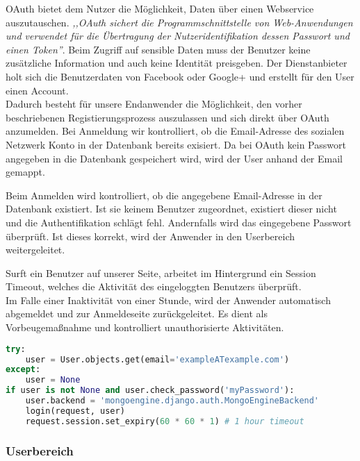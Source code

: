 OAuth bietet dem Nutzer die Möglichkeit, Daten über einen Webservice auszutauschen. \textit{,,OAuth sichert die Programmschnittstelle von Web-Anwendungen und verwendet für die Übertragung der Nutzeridentifikation dessen Passwort und einen Token''}\cite{OAUTH}. Beim Zugriff auf sensible Daten muss der Benutzer keine zusätzliche Information und auch keine Identität preisgeben. Der Dienstanbieter holt sich die Benutzerdaten von Facebook oder Google+ und erstellt für den User einen Account.\\
Dadurch besteht für unsere Endanwender die Möglichkeit, den vorher beschriebenen Registierungsprozess auszulassen und sich direkt über OAuth anzumelden. Bei Anmeldung wir kontrolliert, ob die Email-Adresse des sozialen Netzwerk Konto in der Datenbank bereits exisiert. Da bei OAuth kein Passwort angegeben in die Datenbank gespeichert wird, wird der User anhand der Email gemappt.





Beim Anmelden wird kontrolliert, ob die angegebene Email-Adresse in der Datenbank existiert. Ist sie keinem Benutzer zugeordnet, existiert dieser nicht und die Authentifikation schlägt fehl. Andernfalls wird das eingegebene Passwort überprüft. Ist dieses korrekt, wird der Anwender in den Userbereich weitergeleitet.

Surft ein Benutzer auf unserer Seite, arbeitet im Hintergrund ein Session Timeout, welches die Aktivität des eingeloggten Benutzers überprüft.\\
Im Falle einer Inaktivität von einer Stunde, wird der Anwender automatisch abgemeldet und zur Anmeldeseite zurückgeleitet. Es dient als Vorbeugemaßnahme und kontrolliert unauthorisierte Aktivitäten.

\begin{lstlisting}[caption={Session Timeout}, language=Python]
try:
    user = User.objects.get(email='exampleATexample.com')
except:
    user = None
if user is not None and user.check_password('myPassword'):
    user.backend = 'mongoengine.django.auth.MongoEngineBackend'
    login(request, user)
    request.session.set_expiry(60 * 60 * 1) # 1 hour timeout
\end{lstlisting}
\newpage 

\subsubsection{Userbereich}

